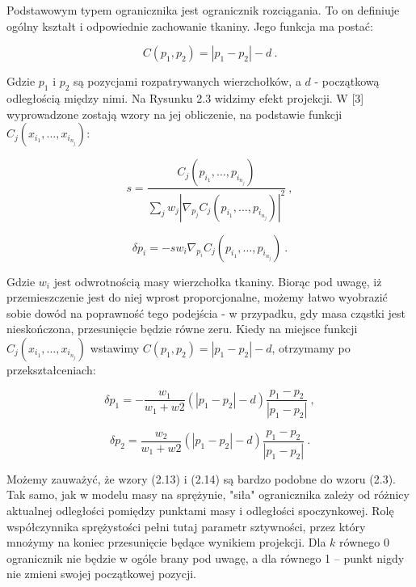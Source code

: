 			
			Podstawowym typem ogranicznika jest ogranicznik rozciągania. To on definiuje ogólny kształt i odpowiednie zachowanie tkaniny. Jego funkcja ma postać:
			
			\begin{equation}
			C(p_{1}, p_{2}) = |p_{1} - p_{2}| - d \ .		
			\end{equation}
			
			Gdzie \( p_{1} \) i \( p_{2} \) są pozycjami rozpatrywanych wierzchołków, a \(d\) - początkową odległością między nimi. Na Rysunku 2.3 widzimy efekt projekcji. W [3] wyprowadzone zostają wzory na jej obliczenie, na podstawie funkcji \( C_{j}(x_{i_{1}}, \dots, x_{i_{n_{j}}} ) \):
			
			\begin{equation}
			s = \frac{C_{j}(p_{i_{1}}, \dots, p_{i_{n_{j}}} )}{ \sum _{j} w_{j} | \nabla _{p_{j}} C_{j}(p_{i_{1}}, \dots, p_{i_{n_{j}}} ) | ^{2} } \ ,		
			\end{equation}
			
			\begin{equation}
			\delta p_{i} = -sw_{i} \nabla _{p_{i}} C_{j}(p_{i_{1}}, \dots, p_{i_{n_{j}}} ) \ .
			\end{equation}
			
			Gdzie \(w_{i}\) jest odwrotnością masy wierzchołka tkaniny. Biorąc pod uwagę, iż przemieszczenie jest do niej wprost proporcjonalne, możemy łatwo wyobrazić sobie dowód na poprawność tego podejścia - w przypadku, gdy masa cząstki jest nieskończona, przesunięcie będzie równe zeru. Kiedy na miejsce funkcji \(C_{j}(x_{i_{1}}, \dots, x_{i_{n_{j}}} ) \) wstawimy \(C(p_{1}, p_{2}) = |p_{1} - p_{2}| - d\), otrzymamy po przekształceniach: 
			
			\begin{equation}
			\delta p_{1} = - \frac{w_{1}}{w_{1} + w{2}} (|p_{1} - p_{2}| - d) \frac{p_{1} - p_{2}}{|p_{1} - p_{2}|} \ ,
			\end{equation}
			
			\begin{equation}
			\delta p_{2} = \frac{w_{2}}{w_{1} + w{2}} (|p_{1} - p_{2}| - d) \frac{p_{1} - p_{2}}{|p_{1} - p_{2}|} \ .
			\end{equation}
			
			Możemy zauważyć, że wzory (2.13) i (2.14) są bardzo podobne do wzoru (2.3). Tak samo, jak w modelu masy na sprężynie, "siła" ogranicznika zależy od różnicy aktualnej odległości pomiędzy punktami masy i odległości spoczynkowej. Rolę współczynnika sprężystości pełni tutaj parametr sztywności, przez który mnożymy na koniec przesunięcie będące wynikiem projekcji. Dla \(k\) równego 0 ogranicznik nie będzie w ogóle brany pod uwagę, a dla równego 1 -- punkt nigdy nie zmieni swojej początkowej pozycji.
			
